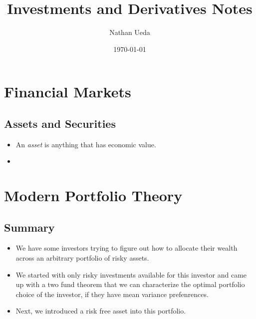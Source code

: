 \documentclass[11pt]{article}
\title{Investments and Derivatives Notes}
\author{Nathan Ueda}
\date{\today}
\begin{document}
\maketitle 
\pagebreak
\tableofcontents 
\pagebreak

\section{Financial Markets}
\subsection{Assets and Securities}
\begin{itemize}
    \item An \textit{asset} is anything that has economic value. 
    \item 
\end{itemize}

\section{Modern Portfolio Theory}

\subsection{Summary}
\begin{itemize}
    \item We have some investors trying to figure out how to allocate their wealth across an 
    arbitrary portfolio of risky assets.
    \item We started with only risky investments available for this investor and came up with a
    two fund theorem that we can characterize the optimal portfolio choice of the investor, if 
    they have mean variance prefenrences.
    \item Next, we introduced a risk free asset into this portfolio.
\end{itemize}

\end{document}

